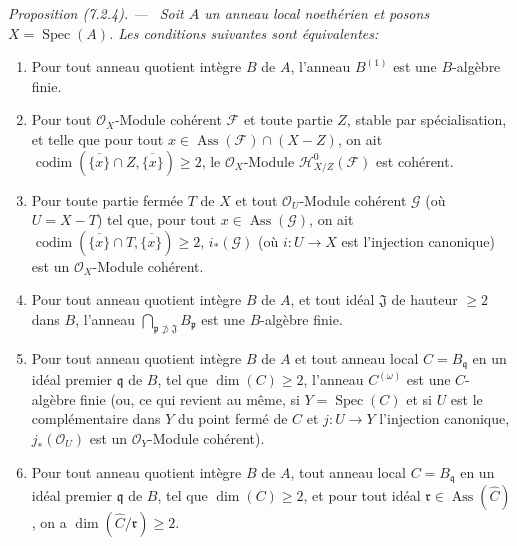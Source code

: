 \documentclass[10pt,oneside]{book}
\newenvironment{proposition}[1][]{%
  \par\medskip\noindent\itshape Proposition (#1). ---\ }{\par}
\begin{document}
\begin{proposition}[7.2.4]
\label{IV.2.s7.2.4-fr}
Soit $A$ un anneau local noethérien et posons
$X=\operatorname{Spec}(A)$. Les conditions suivantes sont équivalentes:
\begin{enumerate}
\item[a)] Pour tout anneau quotient intègre $B$ de $A$, l'anneau $B^{(1)}$
est une $B$-algèbre finie.
\item[b)] Pour tout $\mathscr O_X$-Module cohérent $\mathscr F$ et toute
partie $Z$, stable par spécialisation, et telle que pour tout
$x\in\operatorname{Ass}(\mathscr F)\cap(X-Z)$, on ait
$\operatorname{codim}(\overline{\{x\}}\cap Z,\overline{\{x\}})\geqslant2$,
le $\mathscr O_X$-Module $\mathscr H^0_{X/Z}(\mathscr F)$ est cohérent.
\item[c)] Pour toute partie fermée $T$ de $X$ et tout
$\mathscr O_U$-Module cohérent $\mathscr G$ (où $U=X-T$) tel que, pour tout
$x\in\operatorname{Ass}(\mathscr G)$, on ait
$\operatorname{codim}(\overline{\{x\}}\cap T,\overline{\{x\}})\geqslant2$,
$i_*(\mathscr G)$ (où $i:U\to X$ est l'injection canonique) est un
$\mathscr O_X$-Module cohérent.
\item[d)] Pour tout anneau quotient intègre $B$ de $A$, et tout idéal
$\mathfrak J$ de hauteur $\geqslant2$ dans $B$, l'anneau
$\displaystyle\bigcap_{\mathfrak p\not\supset\mathfrak J}B_{\mathfrak p}$
est une $B$-algèbre finie.
\item[e)] Pour tout anneau quotient intègre $B$ de $A$ et tout anneau local
$C=B_{\mathfrak q}$ en un idéal premier $\mathfrak q$ de $B$, tel que
$\dim(C)\geqslant2$, l'anneau $C^{(\omega)}$ est une $C$-algèbre finie (ou,
ce qui revient au même, si $Y=\operatorname{Spec}(C)$ et si $U$ est le
complémentaire dans $Y$ du point fermé de $C$ et $j:U\to Y$ l'injection
canonique, $j_*(\mathscr O_U)$ est un $\mathscr O_Y$-Module cohérent).
\item[f)] Pour tout anneau quotient intègre $B$ de $A$, tout anneau local
$C=B_{\mathfrak q}$ en un idéal premier $\mathfrak q$ de $B$, tel que
$\dim(C)\geqslant2$, et pour tout idéal
$\mathfrak r\in\operatorname{Ass}(\widehat C)$, on a
$\dim(\widehat C/\mathfrak r)\geqslant2$.
\end{enumerate}
\end{proposition}
\end{document}
